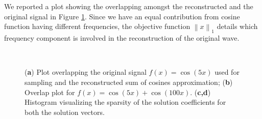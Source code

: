 \documentclass[journal,article,submit,electronics,pdftex]{Definitions/mdpi}
\newcommand{\norm}[1]{\left\lVert#1\right\rVert}
\begin{document}
{We reported a plot showing the overlapping amongst the reconstructed and the original signal in Figure \ref{fig:cos_fitting}.
Since we have an equal contribution from cosine function having different frequencies, the objective function $\norm{x}_1$ details which frequency component is involved in the reconstruction of the original wave. 
\begin{figure}[H]
\centering
\hspace*{\fill}
%
\hspace*{\fill}
%
\\
\hspace*{\fill}
%
\hspace*{\fill}
\hspace*{\fill}
\caption{(\textbf{a}) Plot overlapping the original signal $f(x) = \cos(5x)$ used for sampling and the reconstructed sum of cosines approximation;
(\textbf{b}) Overlap plot for $f(x) = \cos(5x) + \cos(100x)$.
(\textbf{c,d}) Histogram visualizing the sparsity of the solution coefficients for both the solution vectors.}
\label{fig:cos_fitting}
\end{figure}

}
\end{document}
